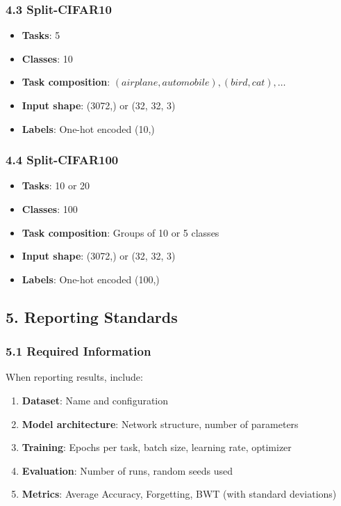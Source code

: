 \documentclass[11pt]{article}
\begin{document}
\subsubsection{4.3 Split-CIFAR10}

\begin{itemize}[leftmargin=*]
\item \textbf{Tasks}: 5
\item \textbf{Classes}: 10
\item \textbf{Task composition}: ${(airplane, automobile), (bird, cat), \ldots}$
\item \textbf{Input shape}: (3072,) or (32, 32, 3)
\item \textbf{Labels}: One-hot encoded (10,)
\end{itemize}

\subsubsection{4.4 Split-CIFAR100}

\begin{itemize}[leftmargin=*]
\item \textbf{Tasks}: 10 or 20
\item \textbf{Classes}: 100
\item \textbf{Task composition}: Groups of 10 or 5 classes
\item \textbf{Input shape}: (3072,) or (32, 32, 3)
\item \textbf{Labels}: One-hot encoded (100,)
\end{itemize}

\subsection{5. Reporting Standards}

\subsubsection{5.1 Required Information}

When reporting results, include:

\begin{enumerate}[leftmargin=*]
\item \textbf{Dataset}: Name and configuration
\item \textbf{Model architecture}: Network structure, number of parameters
\item \textbf{Training}: Epochs per task, batch size, learning rate, optimizer
\item \textbf{Evaluation}: Number of runs, random seeds used
\item \textbf{Metrics}: Average Accuracy, Forgetting, BWT (with standard deviations)
\end{enumerate}
\end{document}
